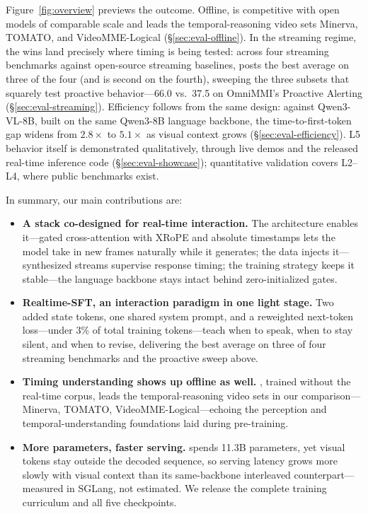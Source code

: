 Figure~\ref{fig:overview} previews the outcome. Offline,
\mossinstruct{} is competitive with open models of comparable scale
and leads the temporal-reasoning video sets Minerva, TOMATO, and
VideoMME-Logical (\S\ref{sec:eval-offline}). In the streaming regime,
the wins land precisely where timing is being tested: across four
streaming benchmarks against open-source streaming baselines,
\mossrealtime{} posts the best average on three of the four (and is
second on the fourth), sweeping the three subsets that squarely test
proactive behavior---66.0 vs.\ 37.5 on OmniMMI's Proactive Alerting
(\S\ref{sec:eval-streaming}). Efficiency follows from the same design:
against Qwen3-VL-8B, built on the same Qwen3-8B language backbone, the
time-to-first-token gap widens from $2.8\times$ to $5.1\times$ as
visual context grows (\S\ref{sec:eval-efficiency}). L5 behavior itself
is demonstrated qualitatively, through live demos and the released
real-time inference code (\S\ref{sec:eval-showcase}); quantitative
validation covers L2--L4, where public benchmarks exist.

\pagebreak
In summary, our main contributions are:
\begin{itemize}[leftmargin=1.5em, itemsep=2pt, topsep=2pt]
  \item \textbf{A stack co-designed for real-time interaction.} The
  architecture enables it---gated cross-attention with XRoPE and
  absolute timestamps lets the model take in new frames naturally
  while it generates;
  the data injects it---synthesized streams supervise response
  timing; the training strategy keeps it stable---the language backbone
  stays intact behind zero-initialized gates.
  \item \textbf{Realtime-SFT, an interaction paradigm in one light
  stage.} Two added state tokens, one shared system prompt, and a
  reweighted next-token loss---under 3\% of total training
  tokens---teach when to speak, when to stay silent, and when to
  revise, delivering the best average on three of four streaming
  benchmarks and the proactive sweep above.
  \item \textbf{Timing understanding shows up offline as well.}
  \mossinstruct{}, trained without the real-time corpus, leads the
  temporal-reasoning video sets in our
  comparison---Minerva, TOMATO, VideoMME-Logical---echoing the
  perception and temporal-understanding foundations laid during
  pre-training.
  \item \textbf{More parameters, faster serving.} \mossvl{} spends 11.3B
  parameters, yet visual tokens stay outside the decoded sequence, so
  serving latency grows more slowly with visual context than its
  same-backbone interleaved counterpart---measured in SGLang, not
  estimated. We release the complete training curriculum and all five
  checkpoints.
\end{itemize}
